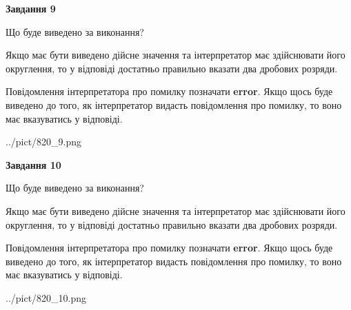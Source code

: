 \documentclass[12pt, ukrainian]{article}
\begin{document}
{\begin {Large}
{\begin {center}\textbf{Завдання 9}\end {center}}\par
Що буде виведено за виконання? \par

Якщо має бути виведено дійсне значення та інтерпретатор має здійснювати його округлення, 
то у відповіді достатньо правильно вказати два дробових розряди.

Повідомлення інтерпретатора про помилку позначати \textbf{error}.
Якщо щось буде виведено до того, як інтерпретатор видасть повідомлення про помилку, 
то воно має вказуватись у відповіді. \par

\begin{center}
	{../pict/820_9.png}
\end{center}
\newpage

{\begin {center}\textbf{Завдання 10}\end {center}}\par
Що буде виведено за виконання? \par

Якщо має бути виведено дійсне значення та інтерпретатор має здійснювати його округлення, 
то у відповіді достатньо правильно вказати два дробових розряди.

Повідомлення інтерпретатора про помилку позначати \textbf{error}.
Якщо щось буде виведено до того, як інтерпретатор видасть повідомлення про помилку, 
то воно має вказуватись у відповіді. \par

\begin{center}
	{../pict/820_10.png}
\end{center}
\newpage

\end {Large}}
\end{document}
